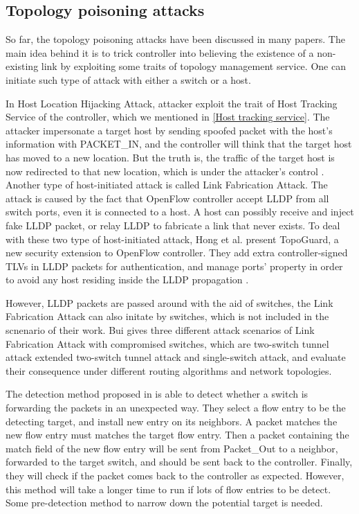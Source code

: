 \subsection{Topology poisoning attacks}
So far, the topology poisoning attacks have been discussed in many papers. The main idea behind it is to trick controller into believing the existence of a non-existing link by exploiting some traits of topology management service. One can initiate such type of attack with either a switch or a host.

In Host Location Hijacking Attack, attacker exploit the trait of Host Tracking Service of the controller, which we mentioned in \ref{Host tracking service}. The attacker impersonate a target host by sending spoofed packet with the host's information with PACKET_IN, and the controller will think that the target host has moved to a new location. But the truth is, the traffic of the target host is now redirected to that new location, which is under the attacker's control \cite{HXWG15}. Another type of host-initiated attack is called Link Fabrication Attack. The attack is caused by the fact that OpenFlow controller accept LLDP from all switch ports, even it is connected to a host. A host can possibly receive and inject fake LLDP packet, or relay LLDP to fabricate a link that never exists. To deal with these two type of host-initiated attack, Hong et al. present TopoGuard, a new security extension to OpenFlow controller. They add extra controller-signed TLVs in LLDP packets for authentication, and manage ports' property in order to avoid any host residing inside the LLDP propagation \cite{HXWG15}.  

However, LLDP packets are passed around with the aid of switches, the Link Fabrication Attack can also initate by switches, which is not included in the scnenario of their work. Bui gives three different attack scenarios of Link Fabrication Attack with compromised switches, which are two-switch tunnel attack extended two-switch tunnel attack and single-switch attack, and evaluate their consequence under different routing algorithms and network topologies. \cite{TTB15}


The detection method proposed in \cite{CKGL15} is able to detect whether a switch is forwarding the packets in an unexpected way. They select a flow entry to be the detecting target, and install new entry on its neighbors. A packet matches the new flow entry must matches the target flow entry. Then a packet containing the match field of the new flow entry will be sent from Packet_Out to a neighbor, forwarded to the target switch, and should be sent back to the controller. Finally, they will check if the packet comes back to the controller as expected. However, this method will take a longer time to run if lots of flow entries to be detect. Some pre-detection method to narrow down the potential target is needed.
